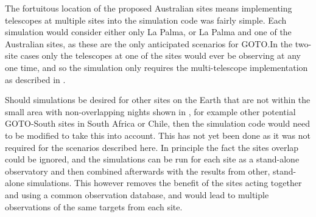 \begin{colsection}
The fortuitous location of the proposed Australian sites means implementing telescopes at multiple sites into the simulation code was fairly simple. Each simulation would consider either only La Palma, or La Palma and one of the Australian sites, as these are the only anticipated scenarios for GOTO.\@ In the two-site cases only the telescopes at one of the sites would ever be observing at any one time, and so the simulation only requires the multi-telescope implementation as described in .

Should simulations be desired for other sites on the Earth that are not within the small area with non-overlapping nights shown in , for example other potential GOTO-South sites in South Africa or Chile, then the simulation code would need to be modified to take this into account. This has not yet been done as it was not required for the scenarios described here. In principle the fact the sites overlap could be ignored, and the simulations can be run for each site as a stand-alone observatory and then combined afterwards with the results from other, stand-alone simulations. This however removes the benefit of the sites acting together and using a common observation database, and would lead to multiple observations of the same targets from each site.

\end{colsection}


